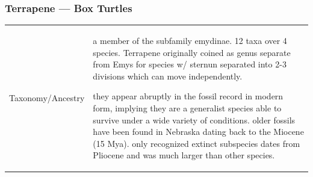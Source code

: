 \subsubsection{Terrapene --- Box Turtles}
\begin{center}
\begin{longtabu} to 

	\hline
	Taxonomy/Ancestry &
	a member of the subfamily emydinae. 12 taxa over 4 species. Terrapene originally coined as genus separate from Emys for species w/ sternun separated into 2-3 divisions which can move independently.
	
	they appear abruptly in the fossil record in modern form, implying they are a generalist species able to survive under a wide variety of conditions. older fossils have been found in Nebraska dating back to the Miocene (15 Mya). only recognized extinct subspecies dates from Pliocene and was much larger than other species.
	

\end{longtabu}
\end{center}
